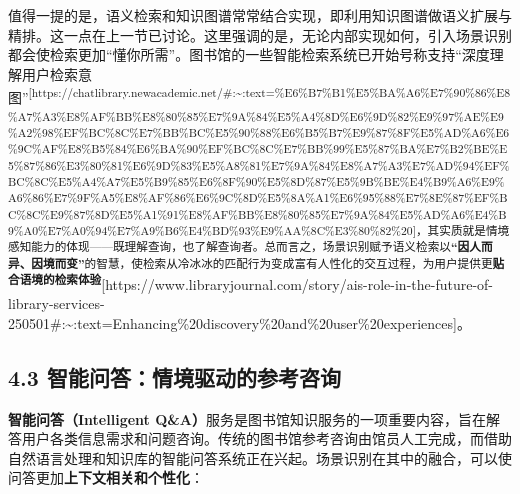 \documentclass[
  letterpaper,
]{scrbook}
\begin{document}
值得一提的是，语义检索和知识图谱常常结合实现，即利用知识图谱做语义扩展与精排。这一点在上一节已讨论。这里强调的是，无论内部实现如何，引入场景识别都会使检索更加``懂你所需''。图书馆的一些智能检索系统已开始号称支持``深度理解用户检索意图''\textsuperscript{{[}https://chatlibrary.newacademic.net/\#:\textasciitilde:text=\%E6\%B7\%B1\%E5\%BA\%A6\%E7\%90\%86\%E8\%A7\%A3\%E8\%AF\%BB\%E8\%80\%85\%E7\%9A\%84\%E5\%A4\%8D\%E6\%9D\%82\%E9\%97\%AE\%E9\%A2\%98\%EF\%BC\%8C\%E7\%BB\%BC\%E5\%90\%88\%E6\%B5\%B7\%E9\%87\%8F\%E5\%AD\%A6\%E6\%9C\%AF\%E8\%B5\%84\%E6\%BA\%90\%EF\%BC\%8C\%E7\%BB\%99\%E5\%87\%BA\%E7\%B2\%BE\%E5\%87\%86\%E3\%80\%81\%E6\%9D\%83\%E5\%A8\%81\%E7\%9A\%84\%E8\%A7\%A3\%E7\%AD\%94\%EF\%BC\%8C\%E5\%A4\%A7\%E5\%B9\%85\%E6\%8F\%90\%E5\%8D\%87\%E5\%9B\%BE\%E4\%B9\%A6\%E9\%A6\%86\%E7\%9F\%A5\%E8\%AF\%86\%E6\%9C\%8D\%E5\%8A\%A1\%E6\%95\%88\%E7\%8E\%87\%EF\%BC\%8C\%E9\%87\%8D\%E5\%A1\%91\%E8\%AF\%BB\%E8\%80\%85\%E7\%9A\%84\%E5\%AD\%A6\%E4\%B9\%A0\%E7\%A0\%94\%E7\%A9\%B6\%E4\%BD\%93\%E9\%AA\%8C\%E3\%80\%82\%20{]}，其实质就是情境感知能力的体现------既理解查询，也了解查询者。总而言之，场景识别赋予语义检索以\textbf{``因人而异、因境而变''}的智慧，使检索从冷冰冰的匹配行为变成富有人性化的交互过程，为用户提供更\textbf{贴合语境的检索体验}}{[}https://www.libraryjournal.com/story/ais-role-in-the-future-of-library-services-250501\#:\textasciitilde:text=Enhancing\%20discovery\%20and\%20user\%20experiences{]}。

\subsection{4.3
智能问答：情境驱动的参考咨询}\label{ux667aux80fdux95eeux7b54ux60c5ux5883ux9a71ux52a8ux7684ux53c2ux8003ux54a8ux8be2}

\textbf{智能问答（Intelligent
Q\&A）}服务是图书馆知识服务的一项重要内容，旨在解答用户各类信息需求和问题咨询。传统的图书馆参考咨询由馆员人工完成，而借助自然语言处理和知识库的智能问答系统正在兴起。场景识别在其中的融合，可以使问答更加\textbf{上下文相关和个性化}：
\end{document}
